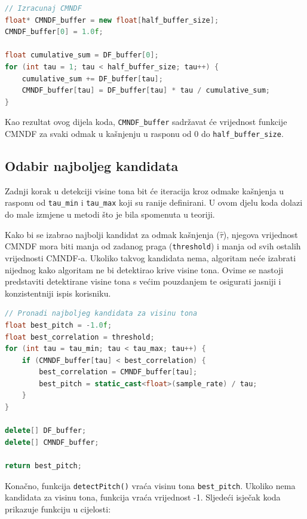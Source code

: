 \documentclass[times, utf8, diplomski, numeric]{fer}
\begin{document}
\begin{lstlisting}[language=C++, frame=single]
// Izracunaj CMNDF
float* CMNDF_buffer = new float[half_buffer_size];
CMNDF_buffer[0] = 1.0f;

float cumulative_sum = DF_buffer[0];
for (int tau = 1; tau < half_buffer_size; tau++) {
	cumulative_sum += DF_buffer[tau];
	CMNDF_buffer[tau] = DF_buffer[tau] * tau / cumulative_sum;
}
\end{lstlisting}

Kao rezultat ovog dijela koda, \verb*|CMNDF_buffer| sadržavat će vrijednost funkcije CMNDF za svaki odmak u kašnjenju u rasponu od 0 do \verb*|half_buffer_size|.

\subsection{Odabir najboljeg kandidata}
%
Zadnji korak u detekciji visine tona bit će iteracija kroz odmake kašnjenja u rasponu od \verb*|tau_min| i \verb*|tau_max| koji su ranije definirani. U ovom djelu koda dolazi do male izmjene u metodi što je bila spomenuta u teoriji.

Kako bi se izabrao najbolji kandidat za odmak kašnjenja ($\hat{\tau}$), njegova vrijednost CMNDF mora biti manja od zadanog praga (\verb*|threshold|) i manja od svih ostalih vrijednosti CMNDF-a. Ukoliko takvog kandidata nema, algoritam neće izabrati nijednog kako algoritam ne bi detektirao krive visine tona. Ovime se nastoji predstaviti detektirane visine tona s većim pouzdanjem te osigurati jasniji i konzistentniji ispis korisniku.

\begin{lstlisting}[language=C++, frame=single]
// Pronadi najboljeg kandidata za visinu tona
float best_pitch = -1.0f;
float best_correlation = threshold;
for (int tau = tau_min; tau < tau_max; tau++) {
	if (CMNDF_buffer[tau] < best_correlation) {
		best_correlation = CMNDF_buffer[tau];
		best_pitch = static_cast<float>(sample_rate) / tau;
	}
}

delete[] DF_buffer;
delete[] CMNDF_buffer;

return best_pitch;
\end{lstlisting}

Konačno, funkcija \verb*|detectPitch()| vraća visinu tona \verb*|best_pitch|. Ukoliko nema kandidata za visinu tona, funkcija vraća vrijednost -1. Sljedeći isječak koda prikazuje funkciju u cijelosti:
\end{document}
